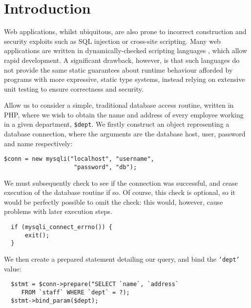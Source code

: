 \documentclass[preprint]{sigplanconf}
\begin{document}



\section{Introduction}
Web applications, whilst ubiquitous, are also prone to incorrect construction and security exploits such as SQL injection or cross-site scripting. Many web applications are written in dynamically-checked scripting languages \cite{}, which allow rapid development. A significant drawback, however, is that such languages do not provide  the same static guarantees about runtime behaviour afforded by programs with more expressive, static type systems, instead relying on extensive unit testing to ensure correctness and security. 

Allow us to consider a simple, traditional database access routine, written in PHP, where we wish to obtain the name and address of every employee working in a given department, \texttt{\$dept}. We firstly construct an object representing a database connection, where the arguments are the database host, user, password and name respectively:

{\small
\begin{verbatim}
$conn = new mysqli("localhost", "username", 
                    "password", "db");
\end{verbatim}
}

We must subsequently check to see if the connection was successful, and cease execution of the database routine if so. Of course, this check is optional, so it would be perfectly possible to omit the check: this would, however, cause problems with later execution steps.

{\small
\begin{verbatim}
  if (mysqli_connect_errno()) {
      exit();
  }
\end{verbatim}
}

We then create a prepared statement detailing our query, and bind the \texttt{`dept'} value:

{\small
\begin{verbatim}
  $stmt = $conn->prepare("SELECT `name`, `address` 
     FROM `staff` WHERE `dept` = ?);
  $stmt->bind_param($dept);
\end{verbatim}
}
\end{document}
